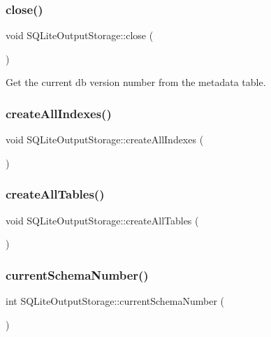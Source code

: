 \subsubsection{\texorpdfstring{close()}{close()}}
{\footnotesize\ttfamily void S\+Q\+Lite\+Output\+Storage\+::close (\begin{DoxyParamCaption}{ }\end{DoxyParamCaption})}



Get the current db version number from the metadata table. 

\mbox{\label{class_s_q_lite_output_storage_a36bb007364e487bb94677f4b744140ef}} 
\subsubsection{\texorpdfstring{createAllIndexes()}{createAllIndexes()}}
{\footnotesize\ttfamily void S\+Q\+Lite\+Output\+Storage\+::create\+All\+Indexes (\begin{DoxyParamCaption}{ }\end{DoxyParamCaption})}

\mbox{\label{class_s_q_lite_output_storage_a957caed87bd56570b9261b76a83ce32e}} 
\subsubsection{\texorpdfstring{createAllTables()}{createAllTables()}}
{\footnotesize\ttfamily void S\+Q\+Lite\+Output\+Storage\+::create\+All\+Tables (\begin{DoxyParamCaption}{ }\end{DoxyParamCaption})}

\mbox{\label{class_s_q_lite_output_storage_a9493d87f401aac870c55e6c1ccc361c7}} 
\subsubsection{\texorpdfstring{currentSchemaNumber()}{currentSchemaNumber()}}
{\footnotesize\ttfamily int S\+Q\+Lite\+Output\+Storage\+::current\+Schema\+Number (\begin{DoxyParamCaption}{ }\end{DoxyParamCaption})}

